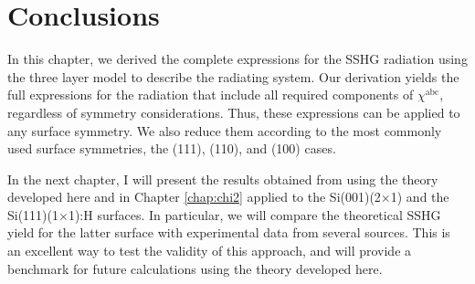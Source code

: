 
\section{Conclusions}

In this chapter, we derived the complete expressions for the SSHG radiation
using the three layer model to describe the radiating system. Our derivation
yields the full expressions for the radiation that include all required
components of $\chi^{\mathrm{abc}}$, regardless of symmetry considerations.
Thus, these expressions can be applied to any surface symmetry. We also reduce
them according to the most commonly used surface symmetries, the (111), (110),
and (100) cases.

In the next chapter, I will present the results obtained from using the theory
developed here and in Chapter \ref{chap:chi2} applied to the Si(001)(2$\times$1)
and the Si(111)(1$\times$1):H surfaces. In particular, we will compare the
theoretical SSHG yield for the latter surface with experimental data from
several sources. This is an excellent way to test the validity of this approach,
and will provide a benchmark for future calculations using the theory developed
here.

\stopcontents[chapters]
